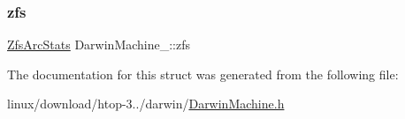 \mbox{\label{structDarwinMachine___a359994573e49408b6b6f9f99a970d673}} 
\subsubsection{\texorpdfstring{zfs}{zfs}}
{\footnotesize\ttfamily \hyperlink{ZfsArcStats_8h_a2adeccbbba50329f61d34f355e5faddc}{Zfs\+Arc\+Stats} Darwin\+Machine\+\_\+\+::zfs}



The documentation for this struct was generated from the following file\+:\begin{DoxyCompactItemize}
\item 
linux/download/htop-\/3../darwin/\hyperlink{DarwinMachine_8h}{Darwin\+Machine.\+h}\end{DoxyCompactItemize}
